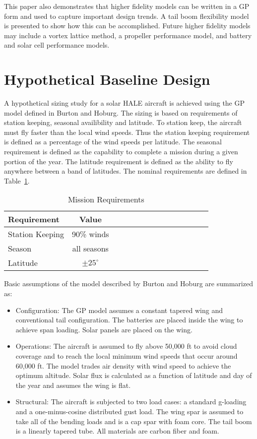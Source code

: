\documentclass[]{aiaa-tc}%
\begin{document}
This paper also demonstrates that higher fidelity models can be written in a GP form and used to capture important design trends.  
A tail boom flexibility model is presented to show how this can be accomplished.  
Future higher fidelity models may include a vortex lattice method, a propeller performance model, and battery and solar cell performance models. 

\section{Hypothetical Baseline Design}

A hypothetical sizing study for a solar HALE aircraft is achieved using the GP model defined in Burton and Hoburg.\cite{burton_solar_2017} 
The sizing is based on requirements of station keeping, seasonal availibility and latitude. 
To station keep, the aircraft must fly faster than the local wind speeds.  
Thus the station keeping requirement is defined as a percentage of the wind speeds per latitude.  
The seasonal requirement is defined as the capability to complete a mission during a given portion of the year.  
The latitude requirement is defined as the ability to fly anywhere between a band of latitudes. 
The nominal requirements are defined in Table~\ref{t:mreqs}.

\begin{longtable}{lccccccccccccc}
\caption{Mission Requirements}\\
\toprule
\toprule
\label{t:mreqs}
Requirement & Value \\ \hline
Station Keeping & 90\% winds \\
Season & all seasons\\
Latitude & $\pm25^{\circ}$\\
\bottomrule
\end{longtable}

Basic assumptions of the model described by Burton and Hoburg are summarized as: 

\begin{itemize}
    \item Configuration: The GP model assumes a constant tapered wing and conventional tail configuration.  The batteries are placed inside the wing to achieve span loading.  Solar panels are placed on the wing.  
    \item Operations: The aircraft is assumed to fly above 50,000 ft to avoid cloud coverage and to reach the local minimum wind speeds that occur around 60,000 ft.\cite{burton_solar_2017} The model trades air density with wind speed to achieve the optimum altitude. Solar flux is calculated as a function of latitude and day of the year and assumes the wing is flat. 
    \item Structural: The aircraft is subjected to two load cases: a standard g-loading and a one-minus-cosine distributed gust load.  The wing spar is assumed to take all of the bending loads and is a cap spar with foam core. The tail boom is a linearly tapered tube.  All materials are carbon fiber and foam.  
    \end{itemize}
\end{document}
